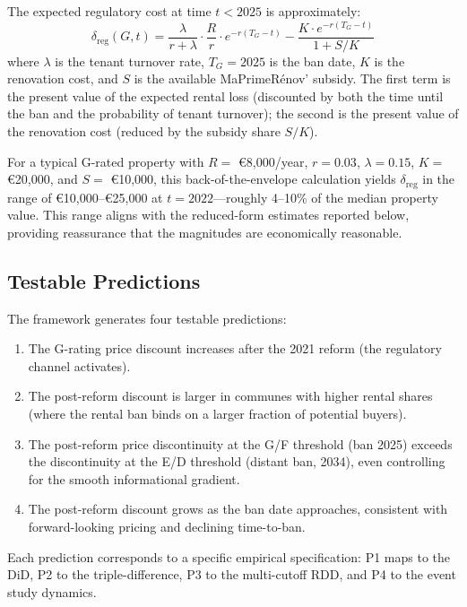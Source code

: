 \documentclass[12pt]{article}
\begin{document}
The expected regulatory cost at time $t < 2025$ is approximately:
\begin{equation}
\delta_{\text{reg}}(G, t) = \frac{\lambda}{r + \lambda} \cdot \frac{R}{r} \cdot e^{-r(T_G - t)} - \frac{K \cdot e^{-r(T_G - t)}}{1 + S/K}
\end{equation}
where $\lambda$ is the tenant turnover rate, $T_G = 2025$ is the ban date, $K$ is the renovation cost, and $S$ is the available MaPrimeR\'enov' subsidy. The first term is the present value of the expected rental loss (discounted by both the time until the ban and the probability of tenant turnover); the second is the present value of the renovation cost (reduced by the subsidy share $S/K$).

For a typical G-rated property with $R = $ \euro{}8,000/year, $r = 0.03$, $\lambda = 0.15$, $K = $ \euro{}20,000, and $S = $ \euro{}10,000, this back-of-the-envelope calculation yields $\delta_{\text{reg}}$ in the range of \euro{}10,000--\euro{}25,000 at $t = 2022$---roughly 4--10\% of the median property value. This range aligns with the reduced-form estimates reported below, providing reassurance that the magnitudes are economically reasonable.

\subsection{Testable Predictions}

The framework generates four testable predictions:
\begin{enumerate}
    \item[\textit{P1.}] The G-rating price discount increases after the 2021 reform (the regulatory channel activates).
    \item[\textit{P2.}] The post-reform discount is larger in communes with higher rental shares (where the rental ban binds on a larger fraction of potential buyers).
    \item[\textit{P3.}] The post-reform price discontinuity at the G/F threshold (ban 2025) exceeds the discontinuity at the E/D threshold (distant ban, 2034), even controlling for the smooth informational gradient.
    \item[\textit{P4.}] The post-reform discount grows as the ban date approaches, consistent with forward-looking pricing and declining time-to-ban.
\end{enumerate}

Each prediction corresponds to a specific empirical specification: P1 maps to the DiD, P2 to the triple-difference, P3 to the multi-cutoff RDD, and P4 to the event study dynamics.
\end{document}
